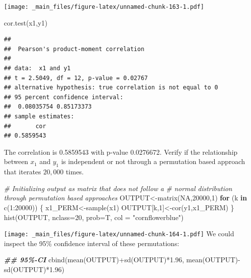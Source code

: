 \documentclass[
  notitlepage,
  onecolumn,
  openany]{book}
\newenvironment{Shaded}{\begin{snugshade}}{\end{snugshade}}
\newcommand{\AttributeTok}[1]{\textcolor[rgb]{0.77,0.63,0.00}{#1}}
\newcommand{\CommentTok}[1]{\textcolor[rgb]{0.56,0.35,0.01}{\textit{#1}}}
\newcommand{\ConstantTok}[1]{\textcolor[rgb]{0.00,0.00,0.00}{#1}}
\newcommand{\ControlFlowTok}[1]{\textcolor[rgb]{0.13,0.29,0.53}{\textbf{#1}}}
\newcommand{\DecValTok}[1]{\textcolor[rgb]{0.00,0.00,0.81}{#1}}
\newcommand{\DocumentationTok}[1]{\textcolor[rgb]{0.56,0.35,0.01}{\textbf{\textit{#1}}}}
\newcommand{\FloatTok}[1]{\textcolor[rgb]{0.00,0.00,0.81}{#1}}
\newcommand{\FunctionTok}[1]{\textcolor[rgb]{0.00,0.00,0.00}{#1}}
\newcommand{\NormalTok}[1]{#1}
\newcommand{\OtherTok}[1]{\textcolor[rgb]{0.56,0.35,0.01}{#1}}
\newcommand{\SpecialCharTok}[1]{\textcolor[rgb]{0.00,0.00,0.00}{#1}}
\newcommand{\StringTok}[1]{\textcolor[rgb]{0.31,0.60,0.02}{#1}}
\begin{document}
\texttt{[image: \_main\_files/figure-latex/unnamed-chunk-163-1.pdf]}

\begin{Shaded}
\begin{Highlighting}[]
\FunctionTok{cor.test}\NormalTok{(x1,y1)}
\end{Highlighting}
\end{Shaded}

\begin{verbatim}
## 
##  Pearson's product-moment correlation
## 
## data:  x1 and y1
## t = 2.5049, df = 12, p-value = 0.02767
## alternative hypothesis: true correlation is not equal to 0
## 95 percent confidence interval:
##  0.08035754 0.85173373
## sample estimates:
##       cor 
## 0.5859543
\end{verbatim}

The correlation is 0.5859543 with p-value 0.0276672. Verify if the relationship between \(x_1\) and \(y_1\) is independent or not through a permutation based approach that iterates \(20,000\) times.

\begin{Shaded}
\begin{Highlighting}[]
\CommentTok{\# Initializing output as matrix that does not follow a }
\CommentTok{\# normal distribution through permutation based approaches}
\NormalTok{OUTPUT}\OtherTok{\textless{}{-}}\FunctionTok{matrix}\NormalTok{(}\ConstantTok{NA}\NormalTok{,}\DecValTok{20000}\NormalTok{,}\DecValTok{1}\NormalTok{)}
\ControlFlowTok{for}\NormalTok{ (k }\ControlFlowTok{in} \FunctionTok{c}\NormalTok{(}\DecValTok{1}\SpecialCharTok{:}\DecValTok{20000}\NormalTok{))}
\NormalTok{\{}
\NormalTok{  x1\_PERM}\OtherTok{\textless{}{-}}\FunctionTok{sample}\NormalTok{(x1)}
\NormalTok{  OUTPUT[k,}\DecValTok{1}\NormalTok{]}\OtherTok{\textless{}{-}}\FunctionTok{cor}\NormalTok{(y1,x1\_PERM)}
\NormalTok{\}}
\FunctionTok{hist}\NormalTok{(OUTPUT, }\AttributeTok{nclass=}\DecValTok{20}\NormalTok{, }\AttributeTok{prob=}\NormalTok{T, }\AttributeTok{col =} \StringTok{"cornflowerblue"}\NormalTok{)}
\end{Highlighting}
\end{Shaded}

\texttt{[image: \_main\_files/figure-latex/unnamed-chunk-164-1.pdf]}
We could inspect the 95\% confidence interval of these permutations:

\begin{Shaded}
\begin{Highlighting}[]
\DocumentationTok{\#\# 95\%{-}CI}
\FunctionTok{cbind}\NormalTok{(}\FunctionTok{mean}\NormalTok{(OUTPUT)}\SpecialCharTok{+}\FunctionTok{sd}\NormalTok{(OUTPUT)}\SpecialCharTok{*}\FloatTok{1.96}\NormalTok{, }\FunctionTok{mean}\NormalTok{(OUTPUT)}\SpecialCharTok{{-}}\FunctionTok{sd}\NormalTok{(OUTPUT)}\SpecialCharTok{*}\FloatTok{1.96}\NormalTok{)}
\end{Highlighting}
\end{Shaded}
\end{document}
